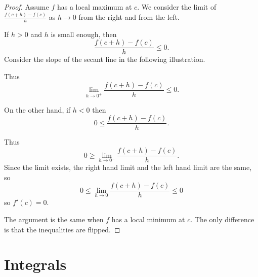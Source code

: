 \documentclass[11pt]{book}
\numberwithin{example}{chapter}
\begin{document}
\begin{proof}
Assume $f$ has a local maximum at $c$.  We consider the limit of $\frac{f(c+h)-f(c)}{h}$ as $h\to 0$ from the right and from the left.  

If $h>0$ and $h$ is small enough, then 
$$\frac{f(c+h)-f(c)}{h}\leq 0.$$
Consider the slope of the secant line in the following illustration.

\begin{center}
\end{center}

Thus $$\lim_{h\to 0^+}\frac{f(c+h)-f(c)}{h}\leq 0.$$

On the other hand, if $h<0$ then 
$$0\leq \frac{f(c+h)-f(c)}{h}.$$


\begin{center}
\end{center}


Thus $$0\geq \lim_{h\to 0^-}\frac{f(c+h)-f(c)}{h}.$$
Since the limit exists, the right hand limit and the left hand limit are the same, so 
$$0\leq \lim_{h\to 0}\frac{f(c+h)-f(c)}{h} \leq 0$$
so $f'(c)=0$.

The argument is the same when $f$ has a local minimum at $c$.  The only difference is that the inequalities are flipped.  

\end{proof}








\chapter{Integrals}  
\end{document}
